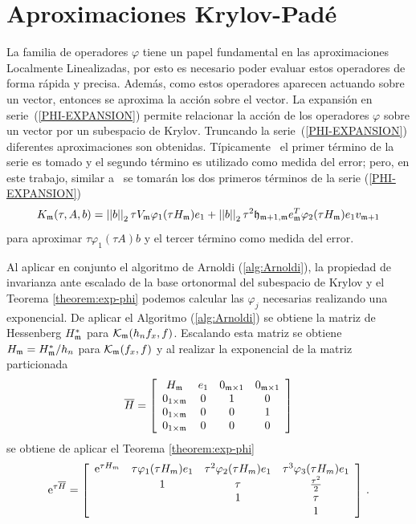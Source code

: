 \section{Aproximaciones Krylov-Padé}\label{section:krylov-pade-approx}

 La familia de operadores $\varphi$ tiene un papel fundamental en las aproximaciones Localmente Linealizadas, por esto es necesario poder evaluar estos operadores de forma rápida y precisa. Además, como estos operadores aparecen actuando sobre un vector, entonces se aproxima la acción sobre el vector. La expansión en serie~(\ref{PHI-EXPANSION}) permite relacionar la acción de los operadores $\varphi$ sobre un vector por un subespacio de Krylov. Truncando la serie~(\ref{PHI-EXPANSION}) diferentes aproximaciones son obtenidas. Típicamente~\cite{niesen2012algorithm,sidje1998expokit,tokman2006efficient} el primer término de la serie es tomado y el segundo término es utilizado como medida del error; pero, en este trabajo, similar a~\cite{Saad92} se tomarán los dos primeros términos de la serie (\ref{PHI-EXPANSION})
 \begin{equation}\label{exact-two-terms-km}
    K_{\mathfrak{m}}(\tau,A,b) = \left\lvert \left\lvert  b  \right\rvert \right\rvert_2\tau V_{\mathfrak{m}}\varphi_1(\tau H_{\mathfrak{m}})e_1 + \left\lvert \left\lvert  b  \right\rvert \right\rvert_2\tau^2\mathfrak{h}_{\mathfrak{m}+1,\mathfrak{m}}e^T_{\mathfrak{m}}\varphi_2(\tau H_{\mathfrak{m}})e_1v_{\mathfrak{m}+1}
 \end{equation}
para aproximar $\tau\varphi_1(\tau A)b$ y el tercer término como medida del error.

Al aplicar en conjunto el algoritmo de Arnoldi (\ref{alg:Arnoldi}), la propiedad de invarianza ante escalado de la base ortonormal del subespacio de Krylov y el Teorema \ref{theorem:exp-phi} podemos calcular las $\varphi_j$ necesarias realizando una exponencial. De aplicar el Algoritmo (\ref{alg:Arnoldi}) se obtiene la matriz de Hessenberg $H^*_{\mathfrak{m}}$ para $\mathcal{K}_{\mathfrak{m}}(h_n f_x,f)$. Escalando esta matriz se obtiene $H_{\mathfrak{m}}=H^*_{\mathfrak{m}}/h_n$ para $\mathcal{K}_{\mathfrak{m}}(f_x,f)$ y al realizar la exponencial de la matriz particionada
\begin{equation*}
    \overline{H} = \left[\begin{array}{cccc}
    H_{\mathfrak{m}} & e_1 & 0_{\mathfrak{m}\times 1} & 0_{\mathfrak{m}\times 1}\\
    0_{1\times\mathfrak{m}} & 0 & 1 & 0\\
    0_{1\times\mathfrak{m}} & 0 & 0 & 1\\
    0_{1\times\mathfrak{m}} & 0 & 0 & 0
    \end{array}\right] \label{hhat_hessenberg_matrix}
    \end{equation*}
se obtiene de aplicar el Teorema \ref{theorem:exp-phi}
\begin{equation}
    \mathrm{e}^{\tau\overline{H}} = \left[\begin{array}{cccc}
    \mathrm{e}^{\tau H_m} & \tau\varphi_1(\tau H_m)e_1 & \tau^{2}\varphi_2(\tau H_m)e_1 &
    \tau^{3}\varphi_3(\tau H_m)e_1 \\
    & 1 & \tau & \frac{\tau^{2}}{2}\\
    &  & 1 & \tau \\
    &   &   & 1 \\
    \end{array}\right] \,. \label{phi_hhat_exponential}
\end{equation}

